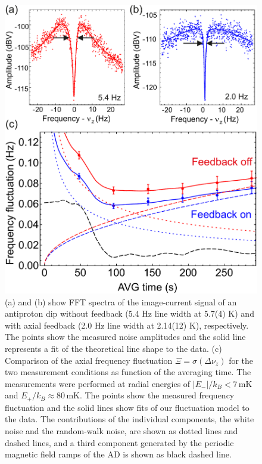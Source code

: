 \documentclass[preprint%
]{elsarticle}
\begin{document}
\begin{figure}[htb]
        \centerline{\includegraphics[width=0.48 \textwidth,keepaspectratio]{FIG2SSF.pdf}}
            \caption[Filter]{
						(a) and (b) show FFT spectra of the image-current signal of an antiproton dip without feedback (5.4 Hz line width at 5.7(4) K) and with axial feedback (2.0 Hz line width at 2.14(12) K), respectively. The points show the measured noise amplitudes and the solid line represents a fit of the theoretical line shape to the data. (c) Comparison of the axial frequency fluctuation $\Xi = \sigma(\Delta\nu_z)$ for the two measurement conditions as function of the averaging time. The measurements were performed at radial energies of $|E_-|/k_B < 7\,$mK and $E_+/k_B \approx 80\,$mK. 
						The points show the measured frequency fluctuation and the solid lines show fits of our fluctuation model to the data. The contributions of the individual components, the white noise and the random-walk noise, are shown as dotted lines and dashed lines, and a third component generated by the periodic magnetic field ramps of the AD is shown as black dashed line.} 
						\label{fig2a}
    \end{figure}
\end{document}

